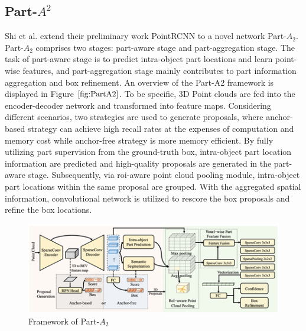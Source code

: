 \subsection{Part-\(A^{2}\)}
Shi et al. extend their preliminary work PointRCNN to a novel network Part-\(A_{2}\)\cite{shi_points_2020}. 
Part-\(A_{2}\) comprises two stages: part-aware stage and part-aggregation stage. The task of part-aware stage is to predict intra-object part locations and learn point-wise features, and part-aggregation stage mainly contributes to part information aggregation and box refinement. An overview of the Part-A2 framework is displayed in Figure \(\ref{fig:PartA2}\). To be specific, 3D Point clouds are fed into the encoder-decoder network and transformed into feature maps. Considering different scenarios, two strategies are used to generate proposals, where anchor-based strategy can achieve high recall rates at the expenses of computation and memory cost while anchor-free strategy is more memory efficient. By fully utilizing part supervision from the ground-truth box, intra-object part location information are predicted and high-quality proposals are generated in the part-aware stage. Subsequently, via \acrshort{roi}-aware point cloud pooling module, intra-object part locations within the same proposal are grouped. With the aggregated spatial information, convolutional network is utilized to rescore the box proposals and refine the box locations. 

\begin{figure}[!htbp]
\centering
\includegraphics[scale=0.8]{Graphics/Part-A2.png}
\caption{Framework of Part-\(A_{2}\)}
\label{fig:PartA2}
\end{figure}
